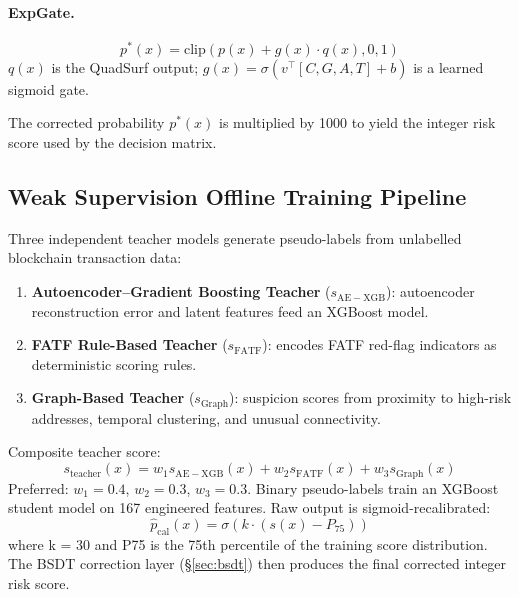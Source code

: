 \documentclass[12pt,a4paper]{article}
\begin{document}
\paragraph{ExpGate.}
\begin{equation}
p^*(x) = \mathrm{clip}\!\left(p(x)+g(x)\cdot q(x),0,1\right)
\end{equation}
$q(x)$ is the QuadSurf output; $g(x)=\sigma(v^\top[C,G,A,T]+b)$ is a
learned sigmoid gate.

The corrected probability $p^*(x)$ is multiplied by 1000 to yield the
integer risk score used by the decision matrix.

\subsection{Weak Supervision Offline Training Pipeline}
\label{sec:ws}

Three independent teacher models generate pseudo-labels from unlabelled
blockchain transaction data:
\begin{enumerate}[label=(\alph*)]
\item \textbf{Autoencoder--Gradient Boosting Teacher} ($s_{\mathrm{AE-XGB}}$):
autoencoder reconstruction error and latent features feed an XGBoost
model.
\item \textbf{FATF Rule-Based Teacher} ($s_{\mathrm{FATF}}$): encodes FATF
red-flag indicators as deterministic scoring rules.
\item \textbf{Graph-Based Teacher} ($s_{\mathrm{Graph}}$): suspicion scores
from proximity to high-risk addresses, temporal clustering, and unusual
connectivity.
\end{enumerate}
Composite teacher score:
\begin{equation}
s_{\mathrm{teacher}}(x) = w_1 s_{\mathrm{AE-XGB}}(x) +
w_2 s_{\mathrm{FATF}}(x) + w_3 s_{\mathrm{Graph}}(x)
\end{equation}
Preferred: $w_1{=}0.4$, $w_2{=}0.3$, $w_3{=}0.3$.
Binary pseudo-labels train an XGBoost student model on 167 engineered
features. Raw output is sigmoid-recalibrated:
\begin{equation}
\hat{p}_{\mathrm{cal}}(x) = \sigma\!\left(k\cdot(s(x)-P_{75})\right)
\end{equation}
where k = 30 and P75 is the 75th percentile of the training
score distribution. The BSDT correction layer (\S\ref{sec:bsdt}) then
produces the final corrected integer risk score.
\end{document}
